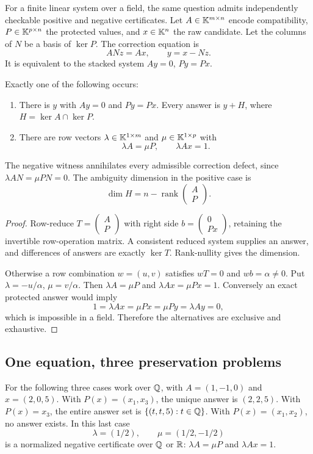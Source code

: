 For a finite linear system over a field, the same question admits independently checkable positive and negative certificates. Let \(A\in\mathbb K^{m\times n}\) encode compatibility, \(P\in\mathbb K^{p\times n}\) the protected values, and \(x\in\mathbb K^n\) the raw candidate. Let the columns of \(N\) be a basis of \(\ker P\). The correction equation is
\[
 ANz=Ax,\qquad y=x-Nz.
\]
It is equivalent to the stacked system \(Ay=0\), \(Py=Px\).

\begin{proposition}\label{KS57}
Exactly one of the following occurs:
\begin{enumerate}
\item There is \(y\) with \(Ay=0\) and \(Py=Px\). Every answer is \(y+H\), where \(H=\ker A\cap\ker P\).
\item There are row vectors \(\lambda\in\mathbb K^{1\times m}\) and \(\mu\in\mathbb K^{1\times p}\) with
\[
 \lambda A=\mu P,\qquad\lambda Ax=1.
\]
\end{enumerate}
The negative witness annihilates every admissible correction defect, since \(\lambda AN=\mu PN=0\). The ambiguity dimension in the positive case is
\[
 \dim H=n-\operatorname{rank}\begin{pmatrix}A\\P\end{pmatrix}.
\]
\end{proposition}
\begin{proof}
Row-reduce \(T=\begin{pmatrix}A\\P\end{pmatrix}\) with right side \(b=\begin{pmatrix}0\\Px\end{pmatrix}\), retaining the invertible row-operation matrix. A consistent reduced system supplies an answer, and differences of answers are exactly \(\ker T\). Rank-nullity gives the dimension.

Otherwise a row combination \(w=(u,v)\) satisfies \(wT=0\) and \(wb=\alpha\ne0\). Put \(\lambda=-u/\alpha\), \(\mu=v/\alpha\). Then \(\lambda A=\mu P\) and \(\lambda Ax=\mu Px=1\). Conversely an exact protected answer would imply
\[
 1=\lambda Ax=\mu Px=\mu Py=\lambda Ay=0,
\]
which is impossible in a field. Therefore the alternatives are exclusive and exhaustive.
\end{proof}

\subsection{One equation, three preservation problems}
For the following three cases work over \(\mathbb Q\), with \(A=(1,-1,0)\) and \(x=(2,0,5)\). With \(P(x)=(x_1,x_3)\), the unique answer is \((2,2,5)\). With \(P(x)=x_3\), the entire answer set is \(\{(t,t,5):t\in\mathbb Q\}\). With \(P(x)=(x_1,x_2)\), no answer exists. In this last case
\[
 \lambda=(1/2),\qquad\mu=(1/2,-1/2)
\]
is a normalized negative certificate over \(\mathbb Q\) or \(\mathbb R\): \(\lambda A=\mu P\) and \(\lambda Ax=1\).

